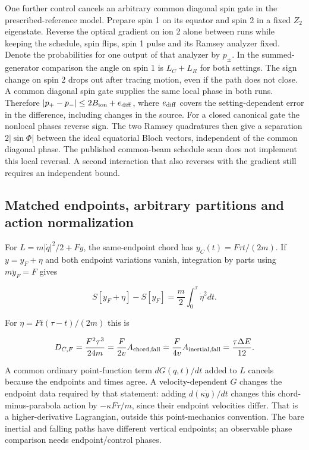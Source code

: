 \documentclass[11pt,a4paper]{article}
\begin{document}
One further control cancels an arbitrary common diagonal spin gate in
the prescribed-reference model. Prepare spin 1 on its equator and spin 2
in a fixed \(Z_2\) eigenstate. Reverse the optical gradient on ion 2
alone between runs while keeping the schedule, spin flips, spin 1 pulse
and its Ramsey analyzer fixed. Denote the probabilities for one output
of that analyzer by \(p_\pm\). In the summed-generator comparison the
angle on spin 1 is \(L_C+L_R\) for both settings. The sign change on
spin 2 drops out after tracing motion, even if the path does not close.
A common diagonal spin gate supplies the same local phase in both runs.
Therefore \(|p_+-p_-|\le 2B_{\rm ion}+e_{\rm diff}\), where
\(e_{\rm diff}\) covers the setting-dependent error in the difference,
including changes in the source. For a closed canonical gate the
nonlocal phases reverse sign. The two Ramsey quadratures then give a
separation \(2|\sin\Phi|\) between the ideal equatorial Bloch vectors,
independent of the common diagonal phase. The published common-beam
schedule scan does not implement this local reversal. A second
interaction that also reverses with the gradient still requires an
independent bound.

\subsection{Matched endpoints, arbitrary partitions and action
normalization}\label{matched-endpoints-arbitrary-partitions-and-action-normalization}

For \(L=m|\dot q|^2/2+Fy\), the same-endpoint chord has
\(y_C(t)=F\tau t/(2m)\). If \(y=y_F+\eta\) and both endpoint variations
vanish, integration by parts using \(m\ddot y_F=F\) gives

\[S[y_F+\eta]-S[y_F]=\frac m2\int_0^\tau\dot\eta^2dt.\]

For \(\eta=Ft(\tau-t)/(2m)\) this is

\[D_{C,F}=\frac{F^2\tau^3}{24m}
 =\frac{F}{2v}A_{\rm chord,fall}
 =\frac{F}{4v}A_{\rm inertial,fall}=\frac{\tau\Delta E}{12}.\]

A common ordinary point-function term \(dG(q,t)/dt\) added to \(L\)
cancels because the endpoints and times agree. A velocity-dependent
\(G\) changes the endpoint data required by that statement: adding
\(d(\kappa\dot y)/dt\) changes this chord-minus-parabola action by
\(-\kappa F\tau/m\), since their endpoint velocities differ. That is a
higher-derivative Lagrangian, outside this point-mechanics convention.
The bare inertial and falling paths have different vertical endpoints;
an observable phase comparison needs endpoint/control phases.
\end{document}
